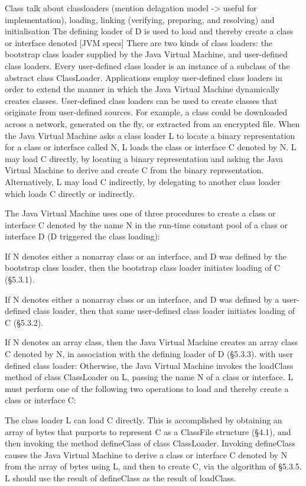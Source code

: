 Class 
talk about classloaders (mention delagation model -> useful for implementation), loading, linking (verifying, preparing, and resolving) and initialisation
The defining loader of D is used to load and thereby create a class or interface denoted [JVM specs] 
There are two kinds of class loaders: the bootstrap class loader supplied by the Java Virtual Machine, and user-defined class loaders. Every user-defined class loader is an instance of a subclass of the abstract class ClassLoader. Applications employ user-defined class loaders in order to extend the manner in which the Java Virtual Machine dynamically creates classes. User-defined class loaders can be used to create classes that originate from user-defined sources. For example, a class could be downloaded across a network, generated on the fly, or extracted from an encrypted file. 
When the Java Virtual Machine asks a class loader L to locate a binary representation for a class or interface called N, L loads the class or interface C denoted by N. L may load C directly, by locating a binary representation and asking the Java Virtual Machine to derive and create C from the binary representation. Alternatively, L may load C indirectly, by delegating to another class loader which loads C directly or indirectly. 

The Java Virtual Machine uses one of three procedures to create a class or interface C denoted by the name N in the run-time constant pool of a class or interface D (D triggered the class loading):

    If N denotes either a nonarray class or an interface, and D was defined by the bootstrap class loader, then the bootstrap class loader initiates loading of C (§5.3.1).

    If N denotes either a nonarray class or an interface, and D was defined by a user-defined class loader, then that same user-defined class loader initiates loading of C (§5.3.2).

    If N denotes an array class, then the Java Virtual Machine creates an array class C denoted by N, in association with the defining loader of D (§5.3.3). 
with user defined class loader:
Otherwise, the Java Virtual Machine invokes the loadClass method of class ClassLoader on L, passing the name N of a class or interface. L must perform one of the following two operations to load and thereby create a class or interface C:

    The class loader L can load C directly. This is accomplished by obtaining an array of bytes that purports to represent C as a ClassFile structure (§4.1), and then invoking the method defineClass of class ClassLoader. Invoking defineClass causes the Java Virtual Machine to derive a class or interface C denoted by N from the array of bytes using L, and then to create C, via the algorithm of §5.3.5. L should use the result of defineClass as the result of loadClass.

